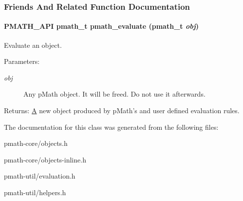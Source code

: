 \subsubsection{Friends And Related Function Documentation}
\hypertarget{classpmath__t_d95c86ef0de178de4d3560518c8a8157}{
\paragraph[{pmath\_\-evaluate}]{\setlength{\rightskip}{0pt plus 5cm}PMATH\_\-API {\bf pmath\_\-t} pmath\_\-evaluate ({\bf pmath\_\-t} {\em obj})}\hfill}
\label{classpmath__t_d95c86ef0de178de4d3560518c8a8157}


Evaluate an object. 

\begin{Desc}
\item[Parameters:]
\begin{description}
\item[{\em obj}]Any pMath object. It will be freed. Do not use it afterwards. \end{description}
\end{Desc}
\begin{Desc}
\item[Returns:]\hyperlink{class_a}{A} new object produced by pMath's and user defined evaluation rules. \end{Desc}


The documentation for this class was generated from the following files:\begin{CompactItemize}
\item 
pmath-core/objects.h\item 
pmath-core/objects-inline.h\item 
pmath-util/evaluation.h\item 
pmath-util/helpers.h\end{CompactItemize}
